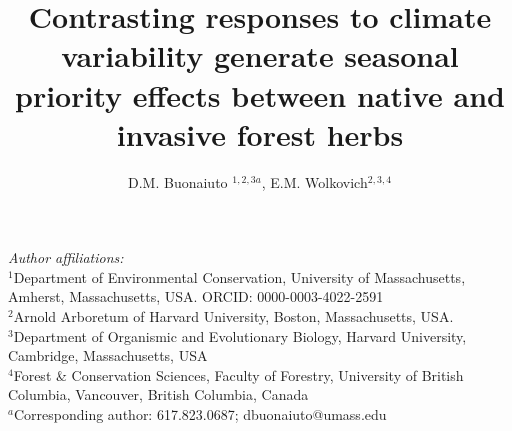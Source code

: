 \documentclass{article}[11pt]
\title{Contrasting responses to climate variability generate seasonal priority effects between native and invasive forest herbs} %
\author{D.M. Buonaiuto $^{1,2,3a}$, E.M. Wolkovich$^{2,3,4}$}
\date{}
\begin{document}

\maketitle

\noindent \emph{Author affiliations:}\\
\noindent $^1$Department of Environmental Conservation, University of Massachusetts, Amherst, Massachusetts, USA. ORCID: 0000-0003-4022-2591\\
\noindent $^2$Arnold Arboretum of Harvard University, Boston, Massachusetts, USA.\\
$^3$Department of Organismic and Evolutionary Biology, Harvard University, Cambridge, Massachusetts, USA \\
$^4$Forest \& Conservation Sciences, Faculty of Forestry, University of British Columbia, Vancouver, British Columbia, Canada\\
$^a$Corresponding author: 617.823.0687; dbuonaiuto@umass.edu\\

\pagebreak
\end{document}
